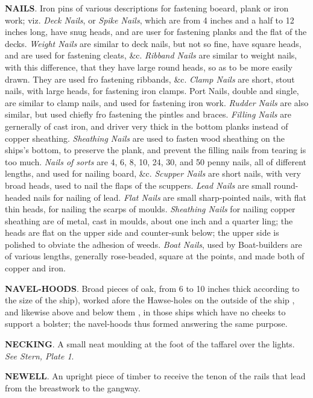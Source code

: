 \textbf{NAILS}. Iron pins of various descriptions for fastening boeard, plank or iron work; viz. \textit{Deck Nails}, or \textit{Spike Nails}, which are from 4 inches and a half to 12 inches long, have snug heads, and are user for fastening planks and the flat of the decks. \textit{Weight Nails} are similar to deck nails, but not so fine, have square heads, and are used for fastening cleats, \&c. \textit{Ribband Nails} are similar to weight nails, with this difference, that they have large round heads, so as to be more easily drawn. They are used fro fastening ribbands, \&c. \textit{Clamp Nails} are short, stout nails, with large heads, for fastening iron clamps. Port Nails, double and single, are similar to clamp nails, and used for fastening iron work. \textit{Rudder Nails} are also similar, but used chiefly fro fastening the pintles and braces. \textit{Filling Nails} are gernerally of cast iron, and driver very thick in the bottom planks instead of copper sheathing. \textit{Sheathing Nails} are used to fasten wood sheathing on the ships's bottom, to preserve the plank, and prevent the filling nails from tearing is too much. \textit{Nails of sorts} are 4, 6, 8, 10, 24, 30, and 50 penny nails, all of different lengths, and used for nailing board, \&c. \textit{Scupper Nails} are short nails, with very broad heads, used to nail the flaps of the scuppers. \textit{Lead Nails} are small round-headed nails for nailing of lead. \textit{Flat Nails} are small sharp-pointed nails, with flat thin heads, for nailing the scarps of moulds. \textit{Sheathing Nails} for nailing copper sheathing are of metal, cast in moulds, about one inch and a quarter ling; the heads are flat on the upper side and counter-sunk below; the upper side is polished to obviate the adhesion of weeds. \textit{Boat Nails}, used by Boat-builders are of various lengths, generally rose-beaded, square at the points, and made both of copper and iron.

\textbf{NAVEL-HOODS}. Broad pieces of oak, from 6 to 10 inches thick according to the size of the ship), worked afore the Hawse-holes on the outside of the ship , and likewise above and below them , in those ships which have no cheeks to support a bolster; the navel-hoods thus formed answering the same purpose.

\textbf{NECKING}. A small neat moulding at the foot of the taffarel over the lights. \textit{See Stern, Plate 1}. 

\textbf{NEWELL}. An upright piece of timber to receive the tenon of the rails that lead from the breastwork to the gangway. 


